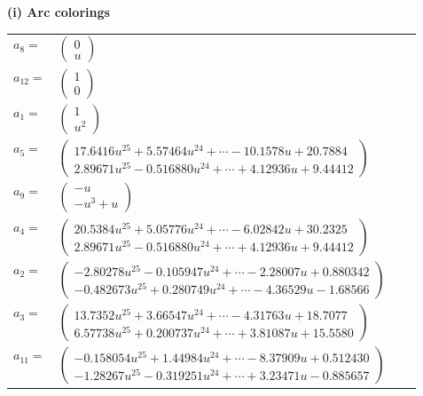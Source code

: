 \documentclass[1p]{elsarticle_modified}
\theoremstyle{definition}
\begin{document}
\flushleft \textbf{(i) Arc colorings}\\
\begin{tabular}{m{7pt} m{180pt} m{7pt} m{180pt} }
\flushright $a_{8}=$&$\begin{pmatrix}0\\u\end{pmatrix}$ \\
\flushright $a_{12}=$&$\begin{pmatrix}1\\0\end{pmatrix}$ \\
\flushright $a_{1}=$&$\begin{pmatrix}1\\u^2\end{pmatrix}$ \\
\flushright $a_{5}=$&$\begin{pmatrix}17.6416 u^{25}+5.57464 u^{24}+\cdots-10.1578 u+20.7884\\2.89671 u^{25}-0.516880 u^{24}+\cdots+4.12936 u+9.44412\end{pmatrix}$ \\
\flushright $a_{9}=$&$\begin{pmatrix}- u\\- u^3+u\end{pmatrix}$ \\
\flushright $a_{4}=$&$\begin{pmatrix}20.5384 u^{25}+5.05776 u^{24}+\cdots-6.02842 u+30.2325\\2.89671 u^{25}-0.516880 u^{24}+\cdots+4.12936 u+9.44412\end{pmatrix}$ \\
\flushright $a_{2}=$&$\begin{pmatrix}-2.80278 u^{25}-0.105947 u^{24}+\cdots-2.28007 u+0.880342\\-0.482673 u^{25}+0.280749 u^{24}+\cdots-4.36529 u-1.68566\end{pmatrix}$ \\
\flushright $a_{3}=$&$\begin{pmatrix}13.7352 u^{25}+3.66547 u^{24}+\cdots-4.31763 u+18.7077\\6.57738 u^{25}+0.200737 u^{24}+\cdots+3.81087 u+15.5580\end{pmatrix}$ \\
\flushright $a_{11}=$&$\begin{pmatrix}-0.158054 u^{25}+1.44984 u^{24}+\cdots-8.37909 u+0.512430\\-1.28267 u^{25}-0.319251 u^{24}+\cdots+3.23471 u-0.885657\end{pmatrix}$ \\

\end{tabular}
\end{document}
